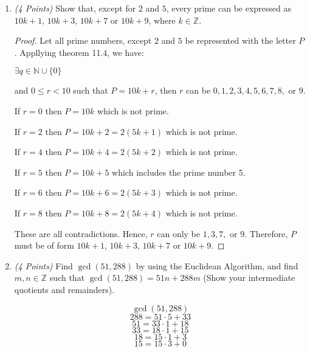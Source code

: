 \documentclass[10pt]{article} %
\newcommand{\N}{\mathbb{N}}
\newcommand{\Z}{\mathbb{Z}}
\newcommand{\points}[1]{{\it (#1 Points)}}
\begin{document}
\begin{enumerate}
\begin{proof}
There is only one solution to this equation, $n = 5.0546$, which is not a positive integer.  This is a contradiction.  Hence, the original statement that for any three consecutive positive integers, the cube of the largest cannot be the sum of the cubes of the other two.

\end{proof}

\bigskip

\item\points{4} Show that, except for $2$ and $5$, every prime can be expressed as $10k+1$, $10k+3$, $10k+7$ or $10k+9$, where $k\in \Z$.

\bigskip

\begin{proof} Let all prime numbers, except $2$ and $5$ be represented with the letter $P$.  Appllying theorem 11.4, we have: 
\begin{center}$\exists q \in \N \cup \{0\}$ \end{center}
\begin{center} and $0 \leq r < 10$ such that $P = 10k+r$, then $r$ can be $0,1,2,3,4,5,6,7,8,$ or $9$. \end{center}
If $r = 0$ then $P = 10k$ which is not prime. 

If $r = 2$ then $P = 10k+2 = 2(5k+1)$ which is not prime. 

If $r = 4$ then $P = 10k+4 = 2(5k+2)$ which is not prime. 

If $r = 5$ then $P = 10k+5$ which includes the prime number 5. 

If $r = 6$ then $P = 10k+6 = 2(5k+3)$ which is not prime. 

If $r = 8$ then $P = 10k+8 = 2(5k+4)$ which is not prime. 

These are all contradictions.  Hence, $r$ can only be $1,3,7,$ or $9$.  Therefore, $P$ must be of form $10k+1$, $10k+3$, $10k+7$ or $10k+9$.  

\end{proof}

\bigskip

\item\points{4}
Find $\gcd(51,288)$ by using the Euclidean Algorithm, and find $m, n \in \Z$ such that $\gcd(51,288) = 51n + 288m$ (Show your  intermediate quotients and remainders).

\bigskip

 $$\gcd(51,288)$$
$$288 = 51 \cdot 5 + 33$$
$$51 = 33 \cdot 1 + 18$$
$$33 = 18 \cdot 1 + 15$$
$$18 = 15 \cdot 1 + 3$$
$$15 = 15 \cdot 3 + 0$$


\end{enumerate}
\end{document}
